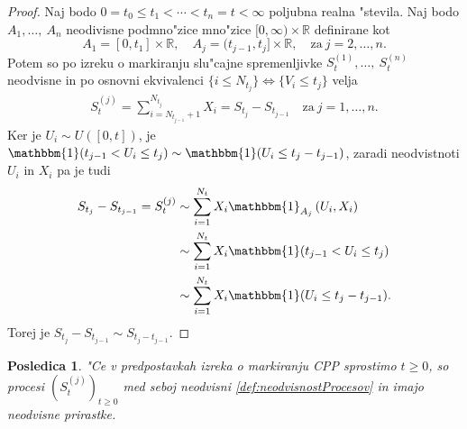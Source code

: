 \documentclass[12pt, a4paper, reqno]{amsart}
\theoremstyle{definition}
\theoremstyle{plain}
\newtheorem{posledica}[definicija]{Posledica}
\newcommand{\R}{\mathbb{R}}
\newcommand{\1}{\mathds{1}}
\newcommand*{\refPriloga}[1]{%
  \begingroup
    \hypersetup{
      linkcolor=red,
      linkbordercolor=red,
    }%
    \ref{#1}%
  \endgroup
}
\begin{document}
        \begin{proof}
            Naj bodo $0=t_0\leq t_1 < \cdots < t_n = t < \infty$
            poljubna realna "stevila. Naj bodo $A_1, \dots, \ A_n$ neodivisne podmno"zice
            mno"zice $[0, \infty) \times \R$ definirane kot
            \begin{equation*}
                A_1 = [0, t_1]\times \R, \quad A_j = (t_{j-1}, t_j]\times \R, \quad \text{za} \ j = 2, \dots, n.
            \end{equation*}
            Potem so po izreku o markiranju slu"cajne spremenljivke $S_{t}^{(1)}, \dots, \ S_{t}^{(n)}$ neodvisne in 
            po osnovni ekvivalenci $\{i\leq N_{t_j}\} \iff \{V_i \leq t_j\}$ velja 
            \begin{align*}
                S^{(j)}_{t} = 
                \sum_{i = N_{t_{j-1}}+ 1}^{N_{t_j}}X_i = S_{t_j} - S_{t_{j-1}} \quad \text{za} \ j = 1, \dots, n.
            \end{align*}
            Ker je $U_i \sim U([0, t])$, je $\mathbbm{1}({t_{j-1}} < U_i\leq t_j) \sim \mathbbm{1}(U_i \leq t_j - t_{j-1})$, 
            zaradi neodvistnoti $U_i$ in $X_i$ pa je tudi 
            \begin{align*}
                S_{t_j} - S_{t_{j-1}} = S_t^{(j)} &\sim \sum_{i=1}^{N_t}X_i\mathbbm{1}_{A_j}\left(U_i, X_i\right) \\
                &\sim \sum_{i=1}^{N_t}X_i\mathbbm{1}({t_{j-1}} < U_i\leq t_j) \\
                &\sim \sum_{i=1}^{N_t}X_i\mathbbm{1}(U_i \leq t_j - t_{j-1}).
            \end{align*}
            Torej je $S_{t_j} - S_{t_{j-1}} \sim S_{t_j - t_{j-1}}$.
        \end{proof}

        \begin{posledica}
            "Ce v predpostavkah izreka o markiranju CPP sprostimo $t\geq0$, so procesi $(S_t^{(j)})_{t\geq0}$ 
            med seboj neodvisni \refPriloga{def:neodvisnostProcesov} in imajo neodvisne prirastke. 
            \label{pos:neodvisnostCPPmedSabo}
        \end{posledica}
\end{document}
